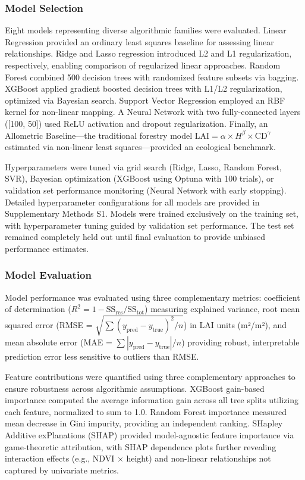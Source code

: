 \subsubsection{Model Selection}

Eight models representing diverse algorithmic families were evaluated. Linear Regression provided an ordinary least squares baseline for assessing linear relationships. Ridge and Lasso regression introduced L2 and L1 regularization, respectively, enabling comparison of regularized linear approaches. Random Forest combined 500 decision trees with randomized feature subsets via bagging. XGBoost applied gradient boosted decision trees with L1/L2 regularization, optimized via Bayesian search. Support Vector Regression employed an RBF kernel for non-linear mapping. A Neural Network with two fully-connected layers ([100, 50]) used ReLU activation and dropout regularization. Finally, an Allometric Baseline---the traditional forestry model $\text{LAI} = \alpha \times H^\beta \times \text{CD}^\gamma$ estimated via non-linear least squares---provided an ecological benchmark.

Hyperparameters were tuned via grid search (Ridge, Lasso, Random Forest, SVR), Bayesian optimization (XGBoost using Optuna with 100 trials), or validation set performance monitoring (Neural Network with early stopping). Detailed hyperparameter configurations for all models are provided in Supplementary Methods S1. Models were trained exclusively on the training set, with hyperparameter tuning guided by validation set performance. The test set remained completely held out until final evaluation to provide unbiased performance estimates.

\subsubsection{Model Evaluation}

Model performance was evaluated using three complementary metrics: coefficient of determination ($R^2 = 1 - \text{SS}_{\text{res}}/\text{SS}_{\text{tot}}$) measuring explained variance, root mean squared error (RMSE = $\sqrt{\sum(y_{\text{pred}} - y_{\text{true}})^2 / n}$) in LAI units (m²/m²), and mean absolute error (MAE = $\sum|y_{\text{pred}} - y_{\text{true}}| / n$) providing robust, interpretable prediction error less sensitive to outliers than RMSE.

Feature contributions were quantified using three complementary approaches to ensure robustness across algorithmic assumptions. XGBoost gain-based importance computed the average information gain across all tree splits utilizing each feature, normalized to sum to 1.0. Random Forest importance measured mean decrease in Gini impurity, providing an independent ranking. SHapley Additive exPlanations (SHAP) \cite{lundbergUnifiedApproachInterpreting2017} provided model-agnostic feature importance via game-theoretic attribution, with SHAP dependence plots further revealing interaction effects (e.g., NDVI $\times$ height) and non-linear relationships not captured by univariate metrics.

